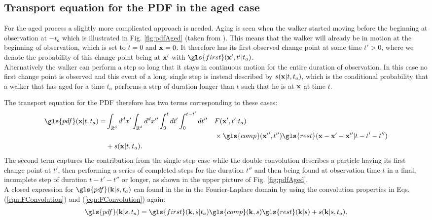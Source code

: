 \subsection{Transport equation for the PDF in the aged case}

For the aged process a slightly more complicated approach is needed. Aging is seen when the walker started moving before the beginning at observation at $-t_a$ which is illustrated in Fig. \ref{fig:pdfAged} (taken from 
\cite{bothe}). 
This means that the walker will already be in motion at the beginning of observation, which is set to $t=0$ and $\mathbf{ x }=0$. It therefore has its first observed change point at some time $t'>0$, where we denote the probability of this change point being at $\mathbf{ x' }$ with $\gls{first}(\ve{x}',t'|t_a)$. \\
Alternatively the walker can perform a step so long that it stays in continuous motion for the entire duration of observation. In this case  no first change point is observed and this event of a long, single step is instead described by $s(\mathbf{ x }|t,t_a)$, which is the conditional probability that a walker that has aged for a time $t_a$ performs a step of duration longer than $t$ such that he is at $\mathbf{ x }$ at time $t$. 

The transport equation for the \gls{PDF} therefore has two terms corresponding to these cases:
%
\begin{alignat}{2}
\gls{pdf}(\ve{x}|t,t_a) = & \int_{\mathbb{R}^d} d^{d}x' \int_{\mathbb{R}^d} d^{d}x'' \int_{0}^{t} dt' \int_{0}^{t-t'} d t'' &&  F(\ve{x}',t'|t_a)\nonumber \\
& && \times \gls{comp}(\ve{x}'',t'') \gls{rest}(\ve{x}-\ve{x}'-\ve{x}''| t-t'-t'')\nonumber \\
& + s(\ve{x}|t,t_a) . && 
\end{alignat}
%
The second term captures the contribution from the single step case while the double convolution describes a particle having its first change point at $t'$, then performing a series of completed steps for the duration $t''$ and then being found at observation time $t$ in a final, incomplete step of duration $t-t'-t''$ or longer, as shown in the upper picture of Fig. \ref{fig:pdfAged}.\\
A closed expression for $\gls{pdf}(\ve{k}|s,t_a)$ can found in the in the Fourier-Laplace domain by using the convolution properties in Eqs.  (\ref{eqn:FConvolution}) and (\ref{eqn:FConvolution}) again:
%
\begin{align}
\gls{pdf}(\ve{k}|s,t_a) =  \gls{first}(\ve{k},s|t_a)  \gls{comp}(\ve{k},s) \gls{rest}(\ve{k}|s) + s(\ve{k}|s,t_a) \label{eqn:pdfAgedFourierLaplace}.
\end{align}


